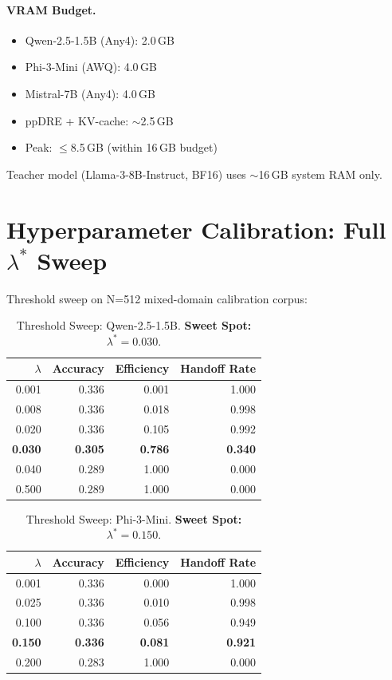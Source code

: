 \documentclass{uai2026}  %
\begin{document}
\paragraph{VRAM Budget.}
\begin{itemize}
  \item Qwen-2.5-1.5B (Any4): 2.0\,GB
  \item Phi-3-Mini (AWQ): 4.0\,GB
  \item Mistral-7B (Any4): 4.0\,GB
  \item ppDRE + KV-cache: $\sim$2.5\,GB
  \item Peak: $\leq$8.5\,GB (within 16\,GB budget)
\end{itemize}
Teacher model (Llama-3-8B-Instruct, BF16) uses $\sim$16\,GB system RAM only.

\section{Hyperparameter Calibration: Full \texorpdfstring{$\lambda^*$}{lambda*} Sweep}
\label{app:calibration}

Threshold sweep on N=512 mixed-domain calibration corpus:

\begin{table}[H]
\centering
\caption{Threshold Sweep: Qwen-2.5-1.5B. \textbf{Sweet Spot: $\lambda^* = 0.030$}.}
\begin{tabular}{@{}rrrr@{}}
\toprule
$\lambda$ & Accuracy & Efficiency & Handoff Rate \\
\midrule
0.001 & 0.336 & 0.001 & 1.000 \\
0.008 & 0.336 & 0.018 & 0.998 \\
0.020 & 0.336 & 0.105 & 0.992 \\
\textbf{0.030} & \textbf{0.305} & \textbf{0.786} & \textbf{0.340} \\
0.040 & 0.289 & 1.000 & 0.000 \\
0.500 & 0.289 & 1.000 & 0.000 \\
\bottomrule
\end{tabular}
\end{table}

\begin{table}[H]
\centering
\caption{Threshold Sweep: Phi-3-Mini. \textbf{Sweet Spot: $\lambda^* = 0.150$}.}
\begin{tabular}{@{}rrrr@{}}
\toprule
$\lambda$ & Accuracy & Efficiency & Handoff Rate \\
\midrule
0.001 & 0.336 & 0.000 & 1.000 \\
0.025 & 0.336 & 0.010 & 0.998 \\
0.100 & 0.336 & 0.056 & 0.949 \\
\textbf{0.150} & \textbf{0.336} & \textbf{0.081} & \textbf{0.921} \\
0.200 & 0.283 & 1.000 & 0.000 \\
\bottomrule
\end{tabular}
\end{table}
\end{document}
